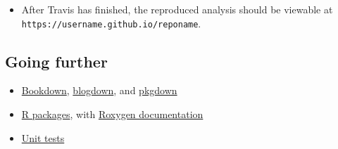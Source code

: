 \documentclass[
]{article}
\newenvironment{Shaded}{\begin{snugshade}}{\end{snugshade}}
\newcommand{\BuiltInTok}[1]{#1}
\newcommand{\CommentTok}[1]{\textcolor[rgb]{0.56,0.35,0.01}{\textit{#1}}}
\newcommand{\ExtensionTok}[1]{#1}
\newcommand{\FunctionTok}[1]{\textcolor[rgb]{0.00,0.00,0.00}{#1}}
\newcommand{\KeywordTok}[1]{\textcolor[rgb]{0.13,0.29,0.53}{\textbf{#1}}}
\newcommand{\NormalTok}[1]{#1}
\newcommand{\OtherTok}[1]{\textcolor[rgb]{0.56,0.35,0.01}{#1}}
\newcommand{\StringTok}[1]{\textcolor[rgb]{0.31,0.60,0.02}{#1}}
\newcommand{\VariableTok}[1]{\textcolor[rgb]{0.00,0.00,0.00}{#1}}
\providecommand{\tightlist}{%
  \setlength{\itemsep}{0pt}\setlength{\parskip}{0pt}}
\begin{document}
\begin{Shaded}
\end{Shaded}

\begin{itemize}
\tightlist
\item
  After Travis has finished, the reproduced analysis should be viewable at \texttt{https://username.github.io/reponame}.
\end{itemize}

\hypertarget{going-further}{%
\subsection{Going further}\label{going-further}}

\begin{itemize}
\tightlist
\item
  \href{https://bookdown.org/}{Bookdown}, \href{https://bookdown.org/yihui/blogdown/}{blogdown}, and \href{https://pkgdown.r-lib.org/}{pkgdown}
\item
  \href{https://hilaryparker.com/2014/04/29/writing-an-r-package-from-scratch/}{R packages}, with \href{https://roxygen2.r-lib.org/}{Roxygen documentation}
\item
  \href{https://testthat.r-lib.org/}{Unit tests}
\end{itemize}
\end{document}
